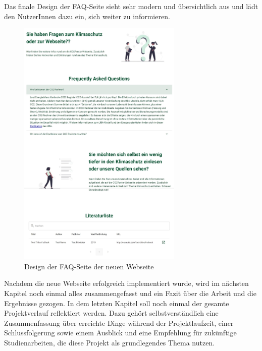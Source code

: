 Das finale Design der FAQ-Seite sieht sehr modern und übersichtlich aus und lädt den NutzerInnen dazu ein, sich weiter zu informieren.

\begin{figure}[H]
    \centering
    \includegraphics[width=0.7\textwidth]{images/06/FAQ-Design.jpeg}
    \caption{Design der FAQ-Seite der neuen Webseite}
    \label{fig:new-co2runter-faq-design}
\end{figure}


Nachdem die neue Webseite erfolgreich implementiert wurde, wird im nächsten Kapitel noch einmal alles zusammengefasst und ein Fazit über die Arbeit und die Ergebnisse gezogen.
In dem letzten Kapitel soll noch einmal der gesamte Projektverlauf reflektiert werden.
Dazu gehört selbstverständlich eine Zusammenfassung über erreichte Dinge während der Projektlaufzeit, einer Schlussfolgerung sowie einem Ausblick und eine Empfehlung für zukünftige Studienarbeiten, die diese Projekt als grundlegendes Thema nutzen.